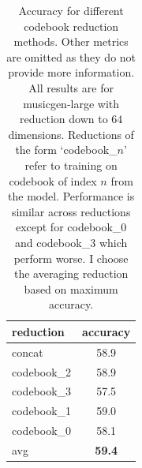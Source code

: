 \begin{table}[H]
    \centering
    \begin{tabular}{lc}
        \toprule
        reduction   & accuracy \\  
        \midrule
        concat       & 58.9     \\
        codebook\_2  & 58.9     \\
        codebook\_3  & 57.5     \\
        codebook\_1  & 59.0     \\
        codebook\_0  & 58.1     \\
        avg          & \textbf{59.4}     \\
        \bottomrule
    \end{tabular}
    \caption{Accuracy for different codebook reduction methods. Other metrics are omitted as they do not provide more information. All results are for musicgen-large with reduction down to $64$ dimensions. Reductions of the form `codebook\_$n$' refer to training on codebook of index $n$ from the model. Performance is similar across reductions except for codebook\_0 and codebook\_3 which perform worse. I choose the averaging reduction based on maximum accuracy. }\label{tab:reduction_accuracy}
\end{table}

